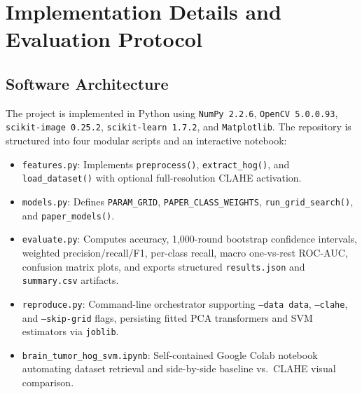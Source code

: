 \documentclass[conference]{IEEEtran}
\begin{document}
\section{Implementation Details and Evaluation Protocol}

\subsection{Software Architecture}
The project is implemented in Python using \texttt{NumPy 2.2.6}, \texttt{OpenCV 5.0.0.93}, \texttt{scikit-image 0.25.2}, \texttt{scikit-learn 1.7.2}, and \texttt{Matplotlib}. The repository is structured into four modular scripts and an interactive notebook:
\begin{itemize}
    \item \texttt{features.py}: Implements \texttt{preprocess()}, \texttt{extract\_hog()}, and \texttt{load\_dataset()} with optional full-resolution CLAHE activation.
    \item \texttt{models.py}: Defines \texttt{PARAM\_GRID}, \texttt{PAPER\_CLASS\_WEIGHTS}, \texttt{run\_grid\_search()}, and \texttt{paper\_models()}.
    \item \texttt{evaluate.py}: Computes accuracy, 1,000-round bootstrap confidence intervals, weighted precision/recall/F1, per-class recall, macro one-vs-rest ROC-AUC, confusion matrix plots, and exports structured \texttt{results.json} and \texttt{summary.csv} artifacts.
    \item \texttt{reproduce.py}: Command-line orchestrator supporting \texttt{--data data}, \texttt{--clahe}, and \texttt{--skip-grid} flags, persisting fitted PCA transformers and SVM estimators via \texttt{joblib}.
    \item \texttt{brain\_tumor\_hog\_svm.ipynb}: Self-contained Google Colab notebook automating dataset retrieval and side-by-side baseline vs.\ CLAHE visual comparison.
\end{itemize}
\end{document}

